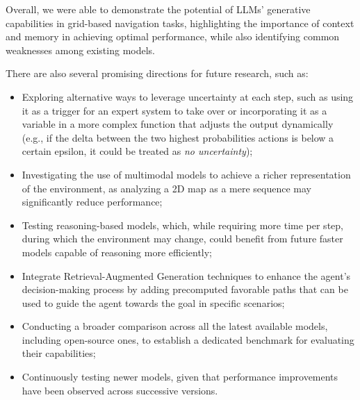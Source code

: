 Overall, we were able to demonstrate the potential of LLMs' generative capabilities
in grid-based navigation tasks, highlighting the importance of context and
memory in achieving optimal performance, while also identifying common weaknesses
among existing models.

There are also several promising directions for future research, such as:

\begin{itemize}
  \item Exploring alternative ways to leverage uncertainty at each step, such as
    using it as a trigger for an expert system to take over or incorporating it
    as a variable in a more complex function that adjusts the output dynamically
    (e.g., if the delta between the two highest probabilities actions is below a
    certain epsilon, it could be treated as \emph{no uncertainty});

  \item Investigating the use of multimodal models to achieve a richer representation
    of the environment, as analyzing a 2D map as a mere sequence may
    significantly reduce performance;

  \item Testing reasoning-based models, which, while requiring more time per step,
    during which the environment may change, could benefit from future faster models
    capable of reasoning more efficiently;

  \item Integrate Retrieval-Augmented Generation techniques to enhance the agent's
    decision-making process by adding precomputed favorable paths that can be used
    to guide the agent towards the goal in specific scenarios;

  \item Conducting a broader comparison across all the latest available models,
    including open-source ones, to establish a dedicated benchmark for evaluating
    their capabilities;

  \item Continuously testing newer models, given that performance improvements
    have been observed across successive versions.
\end{itemize}